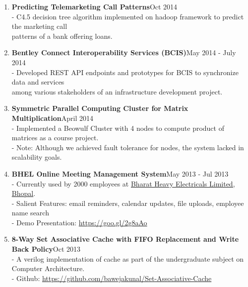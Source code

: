 \documentclass{article}
\begin{document}
\begin{enumerate}
    \item \textbf{Predicting Telemarketing Call Patterns}{\hfill Oct 2014}\\
    - C4.5 decision tree algorithm implemented on hadoop framework to predict the marketing call\\
    \hspace*{0.7em}patterns of a bank offering loans.

    \item \textbf{Bentley Connect Interoperability Services (BCIS)}{\hfill May 2014 - July 2014}\\
    - Developed REST API endpoints and prototypes for BCIS to synchronize data and services\\
    \hspace*{0.7em}among various stakeholders of an infrastructure development project.
    
    \item \textbf{Symmetric Parallel Computing Cluster for Matrix Multiplication}{\hfill April 2014}\\
    - Implemented a Beowulf Cluster with 4 nodes to compute product of matrices as a course project.\\
    - Note: Although we achieved fault tolerance for nodes, the system lacked in scalability goals.
    
    \item \textbf{BHEL Online Meeting Management System}{\hfill May 2013 - Jul 2013}\\
    - Currently used by 2000 employees at \href{https://www.bhelbpl.co.in/bplweb_new/}{Bharat Heavy Electricals Limited, Bhopal}.\\
    - Salient Features: email reminders, calendar updates, file uploads, employee name search\\
    - Demo Presentation: \href{https://goo.gl/2g8aAo}{https://goo.gl/2g8aAo}
    
    \item \textbf{8-Way Set Associative Cache with FIFO Replacement and Write Back Policy}{\hfill Oct 2013}\\
    - A verilog implementation of cache as part of the undergraduate subject on Computer Architecture.\\
    - Github: \href{https://github.com/bawejakunal/Set-Associative-Cache}{https://github.com/bawejakunal/Set-Associative-Cache}
    
\end{enumerate}
\end{document}
